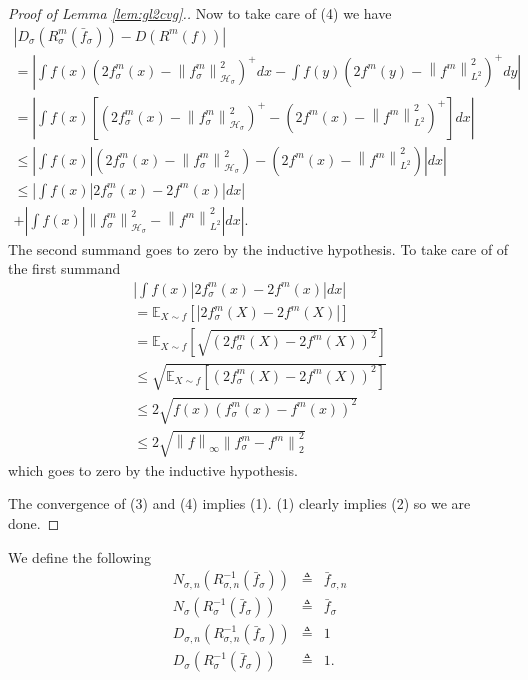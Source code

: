 \documentclass{article} %
\def\hsig{{\mathcal{H}_\sigma}}
\def\kde{{\bar{f}_{\sigma,n}}} %
\def\gkde{{\bar{f}_\sigma}} %
\def\grkdem{{f_{\sigma}^m}}
\def\rfm{{f^m}}
\def\l{\left}
\def\r{\right}
\theoremstyle{definition}
\begin{document}
\begin{proof}[Proof of Lemma \ref{lem:gl2cvg}.]
        Now to take care of (4) we have
        \begin{eqnarray*}
            \l| D_\sigma\left( R_\sigma^{m}\left( \gkde \right) \right) - D\l(R^{m}\left( f \right)\r)\r|\\
		=\l|\int f(x) \left( 2\grkdem\left( x \right) - \l\| \grkdem\r\|_{\hsig}^2 \right)^+ dx -\int f(y) \left( 2\rfm\left( y \right) - \l\| \rfm \r\|_{L^2}^2 \right)^+ dy \r|\\
                = \l|\int f(x) \l[\left( 2\grkdem\left( x \right) - \l\| \grkdem\r\|_{\hsig}^2 \right)^+ - \left( 2\rfm\left( x \right) - \l\| \rfm \r\|_{L^2}^2 \right)^+\r] dx \r|\\
            \le\l|\int f(x) \l|\left( 2\grkdem\left( x \right) - \l\| \grkdem\r\|_{\hsig}^2 \right) - \left( 2\rfm\left( x \right) - \l\| \rfm \r\|_{L^2}^2 \right)\r| dx \r|\\
            \le\l|\int f(x) \l| 2\grkdem\left( x \right)  -  2\rfm\left( x \right) \r| dx \r|\\
            +  \l|\int f(x) \l|\l\| \grkdem\r\|_{\hsig}^2 -  \l\| \rfm \r\|_{L^2}^2 \r| dx \r|.
        \end{eqnarray*}
        The second summand goes to zero by the inductive hypothesis. To take care of of the first summand
        \begin{eqnarray*}
            \l|\int f(x) \l| 2\grkdem\left( x \right)  -  2\rfm\left( x \right) \r| dx \r|\\
            = \mathbb{E}_{X\sim f}\l[\l| 2\grkdem\left( X \right)  -  2\rfm\left( X \right) \r|\r]\\
            = \mathbb{E}_{X\sim f}\l[\sqrt{ \l(2\grkdem\left( X \right)  -  2\rfm\left( X \right)\r)^2 }\r]\\
            \le \sqrt{\mathbb{E}_{X\sim f}\l[ \l(2\grkdem\left( X \right)  -  2\rfm\left( X \right)\r)^2 \r]}\\
            \le 2 \sqrt{ f(x)\l(\grkdem\left( x \right)  -  \rfm\left( x \right)\r)^2 }\\
            \le 2 \sqrt{ \l\|f\r\|_\infty \l\| \grkdem - \rfm\r\|_2^2 }
        \end{eqnarray*}
        which goes to zero by the inductive hypothesis.

        The convergence of (3) and (4) implies (1). (1) clearly implies (2) so we are done.
    \end{proof}

We define the following 
\begin{eqnarray*}
    N_{\sigma,n} \left( R^{-1}_{\sigma,n}\left( \gkde \right) \right) &\triangleq& \kde\\
    N_{\sigma} \left( R^{-1}_{\sigma}\left( \gkde \right) \right) &\triangleq& \gkde\\
    D_{\sigma,n} \left( R^{-1}_{\sigma,n}\left( \gkde \right) \right) &\triangleq& 1\\
    D_{\sigma} \left( R^{-1}_{\sigma}\left( \gkde \right) \right) &\triangleq& 1.
\end{eqnarray*}
\end{document}
